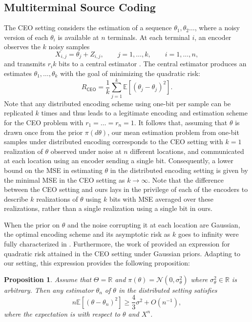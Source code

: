 \documentclass[letterpaper, 11pt]{IEEEtran}      %
\newtheorem{prop}[thm]{\bf {Proposition}}
\newcommand{\ex}[1]{\ensuremath{\mathbb{E}\left[ #1\right]}}
\newcommand{\CEO}{\mathsf{CEO}}
\newcommand{\Ncal}{\mathcal{N}}
\begin{document}
\subsection{Multiterminal Source Coding \label{sec:ceo}}
The CEO setting considers the estimation of a sequence $\theta_1,\theta_2\ldots$, where a noisy version of each $\theta_i$ is available at $n$ terminals. At each terminal $i$, an encoder observes the $k$ noisy samples
\[
X_{i,j} = \theta_j + Z_{i,j},\qquad j=1,\ldots,k, \qquad i = 1,\ldots,n,
\]
and transmits $r_i k$ bits to a central estimator  \cite{berger1996ceo}. The central estimator produces an estimates ${\theta}_1,\ldots,{\theta}_k$ with the goal of minimizing the quadratic risk:
\[
R_{\CEO} = \frac{1}{k} \sum_{j=1}^k \mathbb E \left[\left(\theta_j - {\theta}_j \right)^2 \right]. 
\]
Note that any distributed encoding scheme using one-bit per sample can be replicated $k$ times and thus leads to a legitimate encoding and estimation scheme for the CEO problem with $r_1=\ldots=r_n = 1$. It follows that, assuming that $\theta$ is drawn once from the prior $\pi(d\theta)$, our mean estimation problem from one-bit samples under distributed encoding corresponds to the CEO setting with $k=1$ realization of $\theta$ observed under noise at $n$ different locations, and communicated at each location using an encoder sending a single bit. 
%
Consequently, a lower bound on the MSE in estimating $\theta$ in the distributed encoding setting is given by the minimal MSE in the CEO setting as $k \to \infty$. Note that the difference between the CEO setting and ours lays in the privilege of each of the encoders to describe $k$ realizations of $\theta$ using $k$ bits with MSE averaged over these realizations, rather than a single realization using a single bit in ours. 
 \par
When the prior on $\theta$ and the noise corrupting it at each location are Gaussian, the optimal encoding scheme and its asymptotic risk as $k$ goes to infinity were fully characterized in \cite{prabhakaran2004rate}. Furthermore, the work of \cite{chen2004upper} provided an expression for quadratic risk attained in the CEO setting under Gaussian priors. Adapting to our setting, this expression provides the following proposition:
\begin{prop} \label{prop:ceo_lower_bound}
Assume that $\Theta = \mathbb R$ and $\pi(\theta) = \Ncal(0,\sigma_\theta^2)$ where $\sigma_\theta^2 \in \mathbb R$ is arbitrary. Then any estimator ${\theta}_n$ of $\theta$ in the distributed setting satisfies
\begin{equation} \label{eq:ceo_bound}
 n \ex{\left( \theta - \theta_n \right)^2} \geq \frac{4}{3} \sigma^2 + O(n^{-1}),
\end{equation}
where the expectation is with respect to $\theta$ and $X^n$.
\end{prop}
\end{document}
